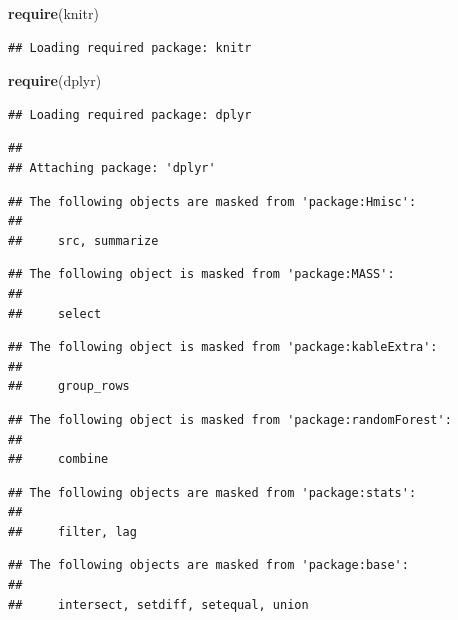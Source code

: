 \documentclass[]{article}
\newenvironment{Shaded}{\begin{snugshade}}{\end{snugshade}}
\newcommand{\KeywordTok}[1]{\textcolor[rgb]{0.13,0.29,0.53}{\textbf{#1}}}
\newcommand{\NormalTok}[1]{#1}
\begin{document}
\begin{Shaded}
\begin{Highlighting}[]
\KeywordTok{require}\NormalTok{(knitr)}
\end{Highlighting}
\end{Shaded}

\begin{verbatim}
## Loading required package: knitr
\end{verbatim}

\begin{Shaded}
\begin{Highlighting}[]
\KeywordTok{require}\NormalTok{(dplyr)}
\end{Highlighting}
\end{Shaded}

\begin{verbatim}
## Loading required package: dplyr
\end{verbatim}

\begin{verbatim}
## 
## Attaching package: 'dplyr'
\end{verbatim}

\begin{verbatim}
## The following objects are masked from 'package:Hmisc':
## 
##     src, summarize
\end{verbatim}

\begin{verbatim}
## The following object is masked from 'package:MASS':
## 
##     select
\end{verbatim}

\begin{verbatim}
## The following object is masked from 'package:kableExtra':
## 
##     group_rows
\end{verbatim}

\begin{verbatim}
## The following object is masked from 'package:randomForest':
## 
##     combine
\end{verbatim}

\begin{verbatim}
## The following objects are masked from 'package:stats':
## 
##     filter, lag
\end{verbatim}

\begin{verbatim}
## The following objects are masked from 'package:base':
## 
##     intersect, setdiff, setequal, union
\end{verbatim}
\end{document}
